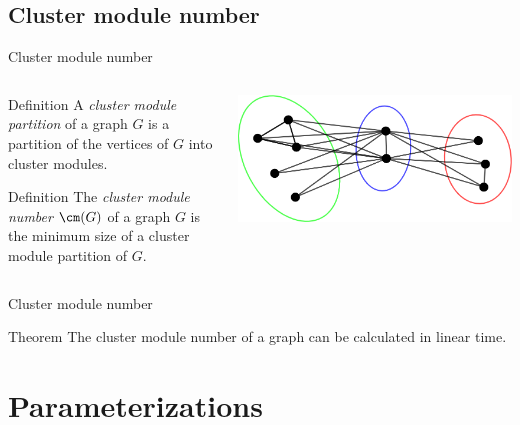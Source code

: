 \documentclass{beamer}
\begin{document}
\subsection{Cluster module number}
\begin{frame}{Cluster module number}
    \begin{columns}
        \begin{column}{0.5\textwidth}
            \begin{block}{Definition}
                A \emph{cluster module partition} of a graph $G$ is a partition of the vertices of $G$ into cluster modules.
            \end{block}

            \begin{block}{Definition}
                The \emph{cluster module number} $\cm(G)$ of a graph $G$ is the minimum size of a cluster module partition of $G$.
            \end{block}
        \end{column}

        \begin{column}{0.5\textwidth}
            \begin{center}
                \includegraphics[width=\textwidth]{img/cluster_module_partition.png}
            \end{center}
        \end{column}
    \end{columns}
\end{frame}

\begin{frame}{Cluster module number}
    \begin{block}{Theorem}
        The cluster module number of a graph can be calculated in linear time.
    \end{block}
\end{frame}

\section{Parameterizations}
\end{document}
